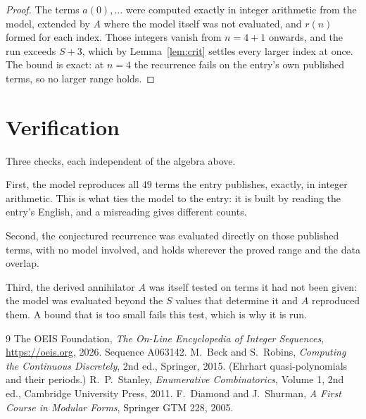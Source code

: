 \documentclass[11pt,a4paper]{article}
\theoremstyle{plain}
\theoremstyle{definition}
\begin{document}
\begin{proof}
The terms $a(0),\dots$ were computed exactly in integer arithmetic from the model, extended by
$A$ where the model itself was not evaluated, and $r(n)$ formed for each index. Those integers
vanish from $n=4+1$ onwards, and the run exceeds $S+3$, which by
Lemma~\ref{lem:crit} settles every larger index at once. The bound is exact: at $n=4$ the recurrence fails on the entry's own published terms, so no larger range holds.
\end{proof}

\section{Verification}

Three checks, each independent of the algebra above.

First, the model reproduces all $49$ terms the entry publishes, exactly, in integer
arithmetic. This is what ties the model to the entry: it is built by reading the entry's
English, and a misreading gives different counts.

Second, the conjectured recurrence was evaluated directly on those published terms, with no
model involved, and holds wherever the proved range and the data overlap.

Third, the derived annihilator $A$ was itself tested on terms it had not been given: the model
was evaluated beyond the $S$ values that determine it and $A$ reproduced them. A bound that is
too small fails this test, which is why it is run.

\begin{thebibliography}{9}
 The OEIS Foundation, \emph{The On-Line Encyclopedia of Integer
Sequences}, \url{https://oeis.org}, 2026. Sequence A063142.
 M.~Beck and S.~Robins, \emph{Computing the Continuous Discretely},
2nd ed., Springer, 2015. (Ehrhart quasi-polynomials and their periods.)
 R.~P.~Stanley, \emph{Enumerative Combinatorics}, Volume 1, 2nd ed.,
Cambridge University Press, 2011.
 F.~Diamond and J.~Shurman, \emph{A First Course in Modular Forms},
Springer GTM 228, 2005.
\end{thebibliography}
\end{document}
